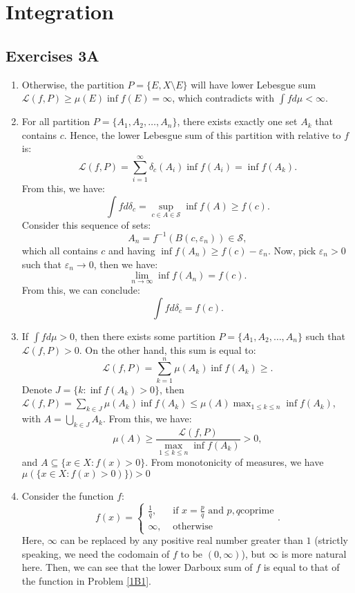 \chapter{Integration} %
\label{cha:Integration}

\section{Exercises 3A} %
\label{sec:Exercises 3A}

\begin{enumerate}[label=\textbf{3A.\arabic*}]
  \item Otherwise, the partition \( P = \{E, X \setminus E\}   \) will have
    lower Lebesgue sum \( \mathcal{L}(f, P) \ge \mu (E) \inf f(E) = \infty \), which
    contradicts with \( \int f d\mu  < \infty \).
  \item 
    For all partition \( P = \{A_{1}, A_{2}, \ldots , A_{n}\}   \), there exists
    exactly one set \( A_{k} \) that contains \( c \). Hence, the lower Lebesgue
    sum of this partition with relative to \( f \) is:
    \[
      \mathcal{L}(f, P) = \sum_{i = 1}^{\infty} \delta_{c} (A_{i}) \inf f(A_{i}) = \inf
      f(A_{k})
    .\] 
    From this, we have:
    \[
      \int f d \delta_{c} = \sup _{c \in A \in \mathcal{S}} \inf f(A) \ge f(c)
    .\] 
    Consider this sequence of sets:
    \[
      A_{n} = f^{-1}(B(c, \varepsilon_{n})) \in \mathcal{S}
    ,\] which all contains \( c \) and having \( \inf f(A_{n}) \ge f(c) -
    \varepsilon_{n} \). Now, pick \( \varepsilon_{n} > 0 \) such that \(
    \varepsilon_{n} \to 0 \), then we have:
    \[
      \lim_{n \to \infty} \inf f(A_{n}) = f(c)
    .\] From this, we can conclude:
    \[
      \int fd \delta_{c} = f(c)
    .\] 
  \item If \( \int fd\mu > 0 \), then there exists some partition \( P = \{A_{1},
    A_{2}, \ldots , A_{n}\}   \) such that \( \mathcal{L}(f, P) > 0 \). On the other hand,
    this sum is equal to:
    \[
      \mathcal{L}(f, P) = \sum_{k = 1}^{n} \mu(A_{k}) \inf f(A_{k}) \ge 
    .\] 
    Denote \( J  =\{k: \inf f(A_{k}) > 0\}   \), then \( \mathcal{L}(f, P) =
    \sum_{k \in J} \mu (A_{k}) \inf f(A_{k}) \le \mu (A)\max_{1 \le k \le n}
    \inf f(A_{k})  \), with \( A
    = \bigcup_{k \in J} A_{k}\). From this, we have:
    \[
      \mu (A) \ge \frac{\mathcal{L}(f, P)}{\max\limits_{1\le k\le n} \inf f(A_{k})} > 0
    ,\] and \( A \subseteq \{x \in X: f(x) > 0\}   \). From monotonicity of
    measures, we have \( \mu (\{x \in X: f(x) > 0 )\}  ) > 0 \)
  \item Consider the function \( f \):
    \[
      f(x) = \begin{cases}
        \frac{1}{q}, &\text{ if } x = \frac{p}{q} \text{ and } p, q \text{
        coprime}\\
        \infty, &\text{ otherwise}
      \end{cases}
    .\] 
    Here, \( \infty \) can be replaced by any positive real number greater than
    \( 1 \) (strictly speaking, we need the codomain of \( f \) to be \( (0,
    \infty) \)), but \( \infty \) is more natural here. Then, we can see that
    the lower Darboux sum of \( f \) is equal to that of the function in Problem
    \ref{1B1}.


\end{enumerate}
